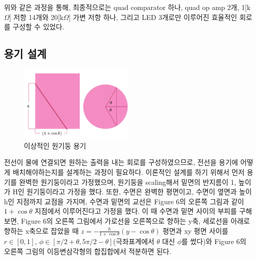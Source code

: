 \documentclass[a4paper,itemph]{oblivoir}
\theoremstyle{definition}
\begin{document}
위와 같은 과정을 통해, 최종적으로는 quad comparator 하나, quad op amp 2개, 1[k$\Omega$] 저항 14개와 20[k$\Omega$] 가변 저항 하나, 그리고 LED 3개로만 이루어진 효율적인 회로를 구성할 수 있었다.

\subsection{용기 설계}
\begin{figure}[hb]
\centering
\includegraphics[width=0.5\textwidth]{cup.PNG}
\caption{이상적인 원기둥 용기}
\end{figure}

전선이 물에 연결되면 원하는 출력을 내는 회로를 구성하였으므로, 전선을 용기에 어떻게 배치해야하는지를 설계하는 과정이 필요하다. 이론적인 설계를 하기 위해서 먼저 용기를 완벽한 원기둥이라고 가정했으며, 원기둥을 scaling해서 밑면의 반지름이 1, 높이가 H인 원기둥이라고 가정을 했다. 또한, 수면은 완벽한 평면이고, 수면이 옆면과 높이 h인 지점까지 교점을 가지며, 수면과 밑면의 교선은 Figure 6의 오른쪽 그림과 같이 $1 + \cos{\theta}$ 지점에서 이루어진다고 가정을 했다. 이 때 수면과 밑면 사이의 부피를 구해보면, Figure 6의 오른쪽 그림에서 가로선을 오른쪽으로 향하는 y축, 세로선을 아래로 향하는 x축으로 잡았을 때 $z = -\frac{h}{1+\cos{\theta}}(y-\cos{\theta})$ 평면과 xy 평면 사이를 $r\in[0, 1]$, $\phi\in[\pi/2+\theta, 5\pi/2-\theta]$(극좌표계에서 $\theta$ 대신 $\phi$를 썼다)와 Figure 6의 오른쪽 그림의 이등변삼각형의 합집합에서 적분하면 된다.
\end{document}

